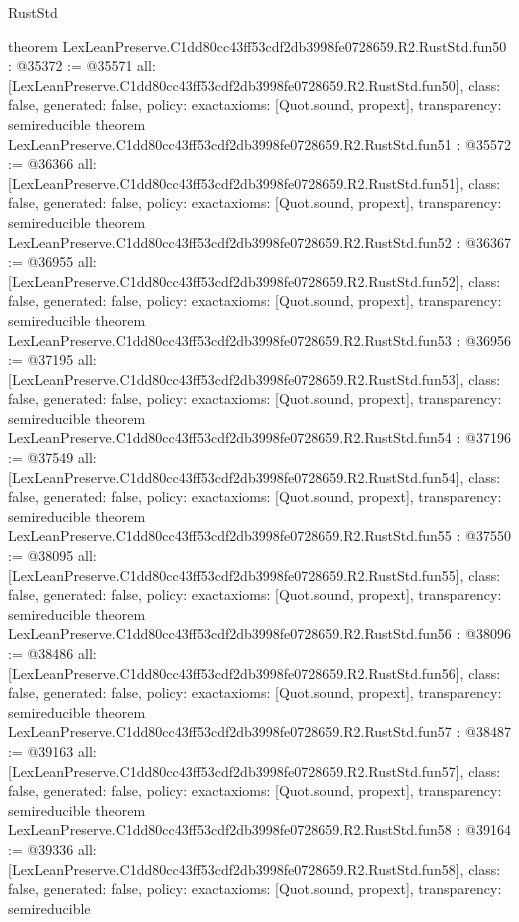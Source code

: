 \begin{lexlean}{RustStd}
\begin{coremodule}
{}
theorem LexLeanPreserve.C1dd80cc43ff53cdf2db3998fe0728659.R2.RustStd.fun50 : @35372 := @35571 {
  all: [LexLeanPreserve.C1dd80cc43ff53cdf2db3998fe0728659.R2.RustStd.fun50],
  class: false,
  generated: false,
  policy: exact{axioms: [Quot.sound, propext]},
  transparency: semireducible
}
theorem LexLeanPreserve.C1dd80cc43ff53cdf2db3998fe0728659.R2.RustStd.fun51 : @35572 := @36366 {
  all: [LexLeanPreserve.C1dd80cc43ff53cdf2db3998fe0728659.R2.RustStd.fun51],
  class: false,
  generated: false,
  policy: exact{axioms: [Quot.sound, propext]},
  transparency: semireducible
}
theorem LexLeanPreserve.C1dd80cc43ff53cdf2db3998fe0728659.R2.RustStd.fun52 : @36367 := @36955 {
  all: [LexLeanPreserve.C1dd80cc43ff53cdf2db3998fe0728659.R2.RustStd.fun52],
  class: false,
  generated: false,
  policy: exact{axioms: [Quot.sound, propext]},
  transparency: semireducible
}
theorem LexLeanPreserve.C1dd80cc43ff53cdf2db3998fe0728659.R2.RustStd.fun53 : @36956 := @37195 {
  all: [LexLeanPreserve.C1dd80cc43ff53cdf2db3998fe0728659.R2.RustStd.fun53],
  class: false,
  generated: false,
  policy: exact{axioms: [Quot.sound, propext]},
  transparency: semireducible
}
theorem LexLeanPreserve.C1dd80cc43ff53cdf2db3998fe0728659.R2.RustStd.fun54 : @37196 := @37549 {
  all: [LexLeanPreserve.C1dd80cc43ff53cdf2db3998fe0728659.R2.RustStd.fun54],
  class: false,
  generated: false,
  policy: exact{axioms: [Quot.sound, propext]},
  transparency: semireducible
}
theorem LexLeanPreserve.C1dd80cc43ff53cdf2db3998fe0728659.R2.RustStd.fun55 : @37550 := @38095 {
  all: [LexLeanPreserve.C1dd80cc43ff53cdf2db3998fe0728659.R2.RustStd.fun55],
  class: false,
  generated: false,
  policy: exact{axioms: [Quot.sound, propext]},
  transparency: semireducible
}
theorem LexLeanPreserve.C1dd80cc43ff53cdf2db3998fe0728659.R2.RustStd.fun56 : @38096 := @38486 {
  all: [LexLeanPreserve.C1dd80cc43ff53cdf2db3998fe0728659.R2.RustStd.fun56],
  class: false,
  generated: false,
  policy: exact{axioms: [Quot.sound, propext]},
  transparency: semireducible
}
theorem LexLeanPreserve.C1dd80cc43ff53cdf2db3998fe0728659.R2.RustStd.fun57 : @38487 := @39163 {
  all: [LexLeanPreserve.C1dd80cc43ff53cdf2db3998fe0728659.R2.RustStd.fun57],
  class: false,
  generated: false,
  policy: exact{axioms: [Quot.sound, propext]},
  transparency: semireducible
}
theorem LexLeanPreserve.C1dd80cc43ff53cdf2db3998fe0728659.R2.RustStd.fun58 : @39164 := @39336 {
  all: [LexLeanPreserve.C1dd80cc43ff53cdf2db3998fe0728659.R2.RustStd.fun58],
  class: false,
  generated: false,
  policy: exact{axioms: [Quot.sound, propext]},
  transparency: semireducible
}
\end{coremodule}
\end{lexlean}
